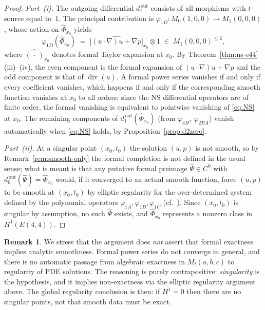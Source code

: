 \documentclass[reqno,10pt]{amsart}
\theoremstyle{definition}
\newtheorem{rem}[subsubsection]{Remark}
\def\divX{{\operatorname{div}}}
\begin{document}
\begin{proof}
\textit{Part~(i).}
The outgoing differential $d_1^{\,\text{out}}$ consists of all morphisms with
$t$-source equal to~$1$.  The principal contribution is
$\varphi_{1D}: M_0(1,0,0)\to M_1(0,0,0)$, whose action on $\widehat{\Phi}_{x_0}$ yields
\[
  \varphi_{1D}(\widehat{\Phi}_{x_0})
  \;=\; \widehat{\bigl[(u\cdot\nabla)u + \nabla p\bigr]}_{x_0}\otimes 1
  \;\in\; M_1(0,0,0)^{\leq 2},
\]
where $\widehat{(\,\cdot\,)}_{x_0}$ denotes formal Taylor expansion at $x_0$.
By Theorem~\ref{thm:ns-e44}(iii)--(iv), the even component is the formal
expansion of $(u\cdot\nabla)u+\nabla p$ and the odd component is that of
$\divX(u)$.  A formal power series vanishes if and only if every
coefficient vanishes, which happens if and only if the corresponding
smooth function vanishes at $x_0$ to all orders; since the NS differential
operators are of finite order, the formal vanishing is equivalent to
pointwise vanishing of \eqref{eq:NS} at $x_0$.  The remaining components
of $d_1^{\,\text{out}}(\widehat{\Phi}_{x_0})$ (from $\varphi_{4H}$,
$\varphi_{2EA}$) vanish automatically when \eqref{eq:NS} holds, by
Proposition~\ref{prop:d2zero}.

\textit{Part~(ii).}
At a singular point $(x_0,t_0)$ the solution $(u,p)$ is not smooth, so
by Remark~\ref{rem:smooth-only} the formal completion is not defined in
the usual sense; what is meant is that any putative formal preimage
$\widehat{\Psi}\in C^0$ with $d_0^{\,\text{out}}(\widehat{\Psi})=\widehat{\Phi}_{x_0}$
would, if it converged to an actual smooth function, force $(u,p)$ to be
smooth at $(x_0,t_0)$ by elliptic regularity for the over-determined
system defined by the polynomial operators
$\varphi_{1A},\varphi_{1B},\varphi_{1C}$ (cf.~\cite{Hormander1963}).
Since $(x_0,t_0)$ is singular by assumption, no such $\widehat{\Psi}$
exists, and $\widehat{\Phi}_{x_0}$ represents a nonzero class in
$H^1(E(4,4))$.
\end{proof}

\begin{rem}\label{rem:exact-not-smooth}
We stress that the argument does \emph{not} assert that formal exactness
implies analytic smoothness.  Formal power series do not converge in
general, and there is no automatic passage from algebraic exactness in
$M_t(a,b,c)$ to regularity of PDE solutions.  The reasoning is purely
contrapositive: \emph{singularity} is the hypothesis, and it implies
non-exactness via the elliptic regularity argument above.  The global
regularity conclusion is then: if $H^1=0$ then there are no singular
points, not that smooth data must be exact.
\end{rem}
\end{document}
